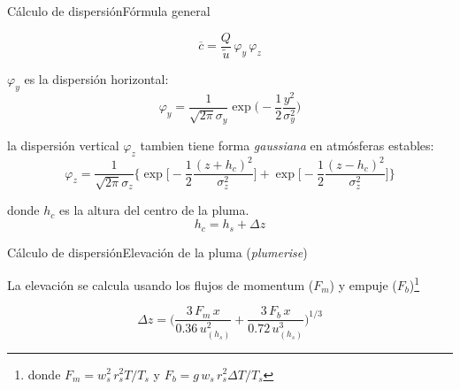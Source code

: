  
\begin{frame}{Cálculo de dispersión}{Fórmula general}

    $$
        \overline{c} = \dfrac{Q}{\tilde{u}}\,\varphi_y\,\varphi_z
    $$
    
$\varphi_y$ es la dispersión horizontal:
$$
\varphi_y =\dfrac{1}{\sqrt{2\pi}\sigma_y}\exp{\bigg(-\dfrac{1}{2}\dfrac{y^2}{\sigma_y^2}\bigg)}
$$

la dispersión vertical $\varphi_z$ tambien tiene forma \textit{gaussiana} en \alert{atmósferas estables}:
$$
\varphi_z =\dfrac{1}{\sqrt{2\pi}\sigma_z} \bigg\{ \exp{\bigg[-\dfrac{1}{2}\dfrac{(z+h_c)^2}{\sigma_z^2}\bigg]} + \exp{\bigg[-\dfrac{1}{2}\dfrac{(z-h_c)^2}{\sigma_z^2}\bigg]} \bigg\}
$$

donde $h_c$ es la altura del centro de la pluma. 
$$h_c=h_s + \Delta z$$
\end{frame}
 
 
 
\begin{frame}{Cálculo de dispersión}{Elevación de la pluma (\textit{plumerise})}
    
    La elevación se calcula usando los flujos de momentum ($F_m$) y empuje ($F_b$)\footnote{ donde $F_m=w_s^2\,r_s^2 T/T_s$ y $F_b=g\,w_s\,r_s^2 \Delta T/T_s$ }
  
  $$ \Delta z = \bigg( \dfrac{3\,F_m\,x}{0.36\,u_{(h_s)}^2} + \dfrac{3\,F_b\,x}{0.72\,u_{(h_s)}^3} \bigg)^{1/3}$$
 \begin{center}
 \end{center}
    
\end{frame}
 



